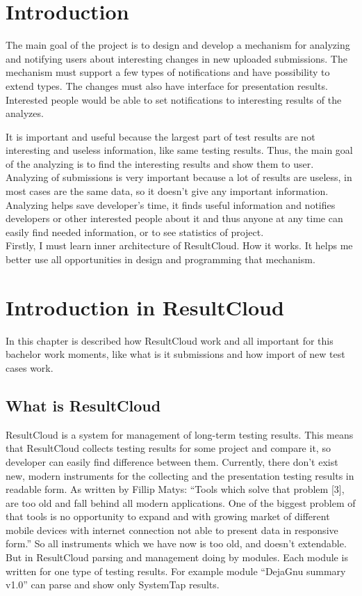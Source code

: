 
\chapter{Introduction}

The main goal of the project is to design and develop a mechanism for analyzing and notifying users about interesting changes in new uploaded submissions. The mechanism must support a few types of notifications and have possibility to extend types. The changes must also have interface for presentation results. Interested people would be able to set notifications to interesting results of the analyzes.

It is important and useful because the largest part of test results are not interesting and useless information, like same testing results. Thus, the main goal of the analyzing is to find the interesting results and show them to user.\\Analyzing of submissions is very important because a lot of results are useless, in most cases are the same data, so it doesn't give any important information. Analyzing helps save developer's time, it finds useful information and notifies developers or other interested people about it and thus anyone at any time can easily find needed information, or to see statistics of project.\\Firstly, I must learn inner architecture of ResultCloud. How it works. It helps me better use all opportunities in design and programming that mechanism.

\chapter{Introduction in ResultCloud}

In this chapter is described how ResultCloud work and all important for this bachelor work moments, like what is it submissions and how import of new test cases work.

\section{What is ResultCloud}

ResultCloud is a system for management of long-term testing results. This means that ResultCloud collects testing results for some project and compare it, so developer can easily find difference between them. Currently, there don't exist new, modern instruments for the collecting and the presentation testing results in readable form. As written by Fillip Matys: “Tools which solve that problem [3], are too old and fall behind all modern applications. One of the biggest problem of that tools is no opportunity to expand and with growing market of different mobile devices with internet connection not able to present data in responsive form.” So all instruments which we have now is too old, and doesn't extendable. But in ResultCloud parsing and management doing by modules. Each module is written for one type of testing results. For example module “DejaGnu summary v1.0” can parse and show only SystemTap results. 

